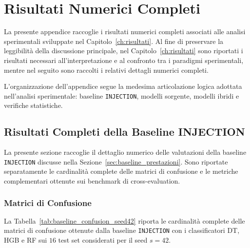\chapter{Risultati Numerici Completi}
\label{app:risultati_completi}

La presente appendice raccoglie i risultati numerici completi associati alle analisi sperimentali sviluppate nel Capitolo~\ref{ch:risultati}.
Al fine di preservare la leggibilità della discussione principale, nel Capitolo~\ref{ch:risultati} sono riportati i risultati necessari all'interpretazione e al confronto tra i paradigmi sperimentali, mentre nel seguito sono raccolti i relativi dettagli numerici completi.

L'organizzazione dell'appendice segue la medesima articolazione logica adottata nell'analisi sperimentale: baseline \texttt{INJECTION}, modelli sorgente, modelli ibridi e verifiche statistiche.



\section{Risultati Completi della Baseline INJECTION}
\label{app:baseline_injection}

La presente sezione raccoglie il dettaglio numerico delle valutazioni della baseline \texttt{INJECTION} discusse nella Sezione~\ref{sec:baseline_prestazioni}. 
Sono riportate separatamente le cardinalità complete delle matrici di confusione e le metriche complementari ottenute sui benchmark di cross-evaluation.

\subsection{Matrici di Confusione}

La Tabella~\ref{tab:baseline_confusion_seed42} riporta le cardinalità complete delle matrici di confusione ottenute dalla baseline \texttt{INJECTION} con i classificatori DT, HGB e RF sui $16$ test set considerati per il seed $s=42$.

